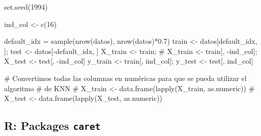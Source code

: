 \documentclass[
  letterpaper,
  DIV=11,
  numbers=noendperiod]{scrartcl}
\newenvironment{Shaded}{\begin{snugshade}}{\end{snugshade}}
\newcommand{\AttributeTok}[1]{\textcolor[rgb]{0.40,0.45,0.13}{#1}}
\newcommand{\CommentTok}[1]{\textcolor[rgb]{0.37,0.37,0.37}{#1}}
\newcommand{\ConstantTok}[1]{\textcolor[rgb]{0.56,0.35,0.01}{#1}}
\newcommand{\DecValTok}[1]{\textcolor[rgb]{0.68,0.00,0.00}{#1}}
\newcommand{\FloatTok}[1]{\textcolor[rgb]{0.68,0.00,0.00}{#1}}
\newcommand{\FunctionTok}[1]{\textcolor[rgb]{0.28,0.35,0.67}{#1}}
\newcommand{\NormalTok}[1]{\textcolor[rgb]{0.00,0.23,0.31}{#1}}
\newcommand{\OtherTok}[1]{\textcolor[rgb]{0.00,0.23,0.31}{#1}}
\newcommand{\SpecialCharTok}[1]{\textcolor[rgb]{0.37,0.37,0.37}{#1}}
\newcommand{\StringTok}[1]{\textcolor[rgb]{0.13,0.47,0.30}{#1}}
\begin{document}
\begin{Shaded}
\begin{Highlighting}[]
\FunctionTok{set.seed}\NormalTok{(}\DecValTok{1994}\NormalTok{)}

\NormalTok{ind\_col }\OtherTok{\textless{}{-}} \FunctionTok{c}\NormalTok{(}\DecValTok{16}\NormalTok{)}

\NormalTok{default\_idx }\OtherTok{=} \FunctionTok{sample}\NormalTok{(}\FunctionTok{nrow}\NormalTok{(datos), }\FunctionTok{nrow}\NormalTok{(datos)}\SpecialCharTok{*}\FloatTok{0.7}\NormalTok{)}
\NormalTok{train }\OtherTok{\textless{}{-}}\NormalTok{ datos[default\_idx, ]; test }\OtherTok{\textless{}{-}}\NormalTok{ datos[}\SpecialCharTok{{-}}\NormalTok{default\_idx, ]}
\NormalTok{X\_train }\OtherTok{\textless{}{-}}\NormalTok{ train; }
\CommentTok{\# X\_train \textless{}{-} train[, {-}ind\_col];}
\NormalTok{X\_test }\OtherTok{\textless{}{-}}\NormalTok{ test[, }\SpecialCharTok{{-}}\NormalTok{ind\_col]}
\NormalTok{y\_train }\OtherTok{\textless{}{-}}\NormalTok{ train[, ind\_col]; y\_test }\OtherTok{\textless{}{-}}\NormalTok{ test[, ind\_col]}

\CommentTok{\# Convertimos todas las columnas en numéricas para que se pueda utilizar el algoritmo}
\CommentTok{\# de KNN}
\CommentTok{\# X\_train \textless{}{-} data.frame(lapply(X\_train, as.numeric))}
\CommentTok{\# X\_test \textless{}{-} data.frame(lapply(X\_test, as.numeric))}
\end{Highlighting}
\end{Shaded}

\subsection{\texorpdfstring{R: Packages
\texttt{caret}}{R: Packages caret}}

\begin{Shaded}
\end{Shaded}
\end{document}
